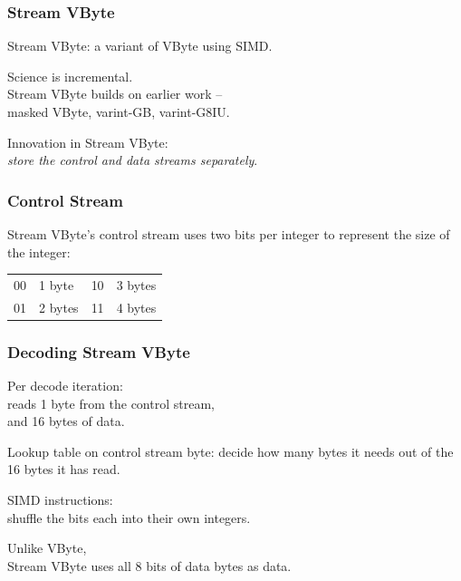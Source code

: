 \begin{frame}
\frametitle{Stream VByte}
\vspace*{-2em}

Stream VByte: a variant of VByte using SIMD.


Science is incremental. \\
Stream VByte builds on earlier work -- \\
\hspace*{2em}masked VByte, {\sc varint}-GB, {\sc varint}-G8IU. 

Innovation in Stream VByte:\\
\hspace*{2em}\emph{store the control and data streams separately}.


\end{frame}

\begin{frame}
\frametitle{Control Stream}
\vspace*{-4em}

Stream VByte's control stream uses two bits per integer to represent the size of the integer:
\begin{center}
\vspace*{-3em}
\begin{tabular}{ll@{~~~~~~~~}ll}
00 & 1 byte & 10 & 3 bytes\\
01 & 2 bytes & 11 & 4 bytes
\end{tabular}
\end{center}


\end{frame}


\begin{frame}
\frametitle{Decoding Stream VByte}


Per decode iteration:\\
\hspace*{2em} reads 1 byte from the control stream,\\
\hspace*{2em} and 16 bytes of data.


Lookup table on control stream byte: decide how many
bytes it needs out of the 16 bytes it has read.

SIMD instructions: \\
\hspace*{2em}shuffle the bits each into their own integers. 

Unlike VByte, \\
Stream VByte uses all 8 bits
of data bytes as data.


\end{frame}



